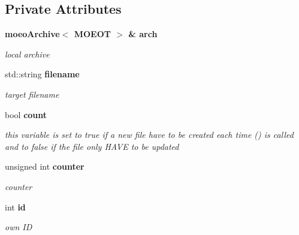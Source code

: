 \subsection*{Private Attributes}
\begin{CompactItemize}
\item 
\bf{moeo\-Archive}$<$ MOEOT $>$ \& \bf{arch}\label{classmoeoArchiveObjectiveVectorSavingUpdater_b252eed0ea4f837efefdcdd81d5c42a6}

\begin{CompactList}\small\item\em local archive \item\end{CompactList}\item 
std::string \bf{filename}\label{classmoeoArchiveObjectiveVectorSavingUpdater_7571569a5fb6df07f5d4e72310ec4d4d}

\begin{CompactList}\small\item\em target filename \item\end{CompactList}\item 
bool \bf{count}\label{classmoeoArchiveObjectiveVectorSavingUpdater_6eb54eb29152e2d357b1b975ce33c062}

\begin{CompactList}\small\item\em this variable is set to true if a new file have to be created each time () is called and to false if the file only HAVE to be updated \item\end{CompactList}\item 
unsigned int \bf{counter}\label{classmoeoArchiveObjectiveVectorSavingUpdater_5ea4722f75597976cf6a21a7fba3ddbc}

\begin{CompactList}\small\item\em counter \item\end{CompactList}\item 
int \bf{id}\label{classmoeoArchiveObjectiveVectorSavingUpdater_cd6940347cf39a47085c4d0a7c558355}

\begin{CompactList}\small\item\em own ID \item\end{CompactList}\end{CompactItemize}


